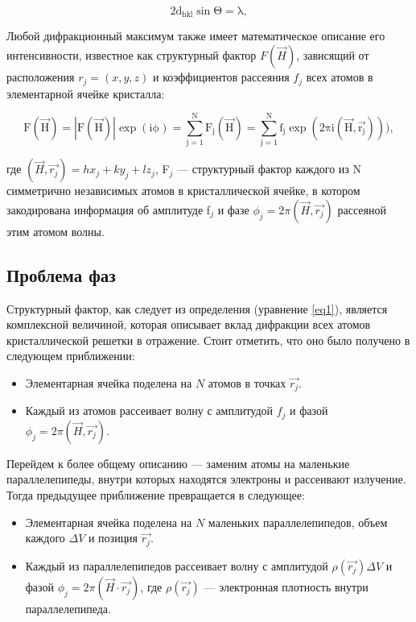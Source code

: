 \begin{equation}\label{wb}
	\mathrm{2d_{hkl}\sin\Theta = \lambda,}
\end{equation}

Любой дифракционный максимум также имеет математическое описание его интенсивности, известное как структурный фактор $F(\overrightarrow{H})$, зависящий от расположения $r_j = (x,y,z)$ и коэффициентов рассеяния $f_j$ всех атомов в элементарной ячейке кристалла:

\begin{equation}\label{eq1}
	\mathrm{ 
		F(\overrightarrow{H}) = |F(\overrightarrow{H})|\exp(i\phi) = \sum\limits_{j=1}^N F_j (\overrightarrow{H}) = \sum\limits_{j=1}^N f_j \exp(2\pi i(\overrightarrow{H},\overrightarrow{r_j}))),}
\end{equation}

где $(\overrightarrow{H}, \overrightarrow{r_j}) = hx_j+ky_j+lz_j$, F$_j$ --- структурный фактор каждого из N симметрично независимых атомов в кристаллической ячейке, в котором закодирована информация об амплитуде f$_j$ и фазе $\phi_j = 2\pi (\overrightarrow{H}, \overrightarrow{r_j})$ рассеяной этим атомом волны.



\subsection{Проблема фаз}

Структурный фактор, как следует из определения (уравнение \ref{eq1}), является комплексной величиной, которая описывает вклад дифракции всех атомов кристаллической решетки в отражение. Стоит отметить, что оно было получено в следующем приближении:

\begin{itemize}
\item Элементарная ячейка поделена на $N$ атомов в точках $\overrightarrow{r_j}$.

\item Каждый из атомов рассеивает волну с амплитудой $f_j$  и фазой $\phi_j = 2\pi (\overrightarrow{H}, \overrightarrow{r_j})$.
\end{itemize}

Перейдем к более общему описанию --- заменим атомы на маленькие параллелепипеды, внутри которых находятся электроны и рассеивают излучение. Тогда предыдущее приближение превращается в следующее:

\begin{itemize}
\item Элементарная ячейка поделена на $N$ маленьких параллелепипедов, объем каждого $\Delta V$ и позиция $\overrightarrow{r_j}$.

\item Каждый из параллелепипедов рассеивает волну с амплитудой $\rho(\overrightarrow{r_j})\Delta V$  и фазой $\phi_j = 2\pi (\overrightarrow{H}\cdot\overrightarrow{r_j})$, где $\rho(\overrightarrow{r_j})$ --- электронная плотность внутри параллелепипеда.
\end{itemize}

